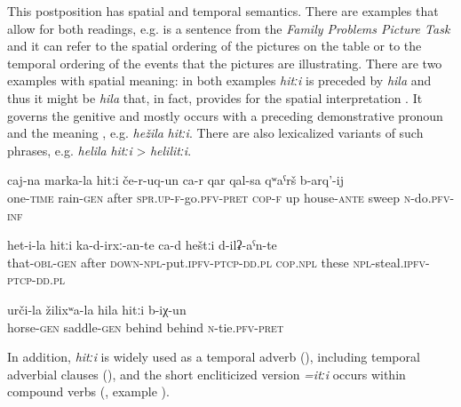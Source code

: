 This postposition has spatial and temporal semantics. There are examples that allow for both readings, e.g.  is a sentence from the \textit{Family Problems Picture Task} \citep{SanRoqueEtAl2012} and it can refer to the spatial ordering of the pictures on the table or to the temporal ordering of the events that the pictures are illustrating. There are two examples with spatial meaning: in both examples \textit{hitːi} is preceded by \textit{hila} and thus it might be \textit{hila} that, in fact, provides for the spatial interpretation . It governs the genitive and mostly occurs with a preceding demonstrative pronoun and the meaning , e.g. \textit{hežila} \textit{hitːi}. There are also lexicalized variants of such phrases, e.g. \textit{helila} \textit{hitːi} > \textit{helilitːi}.
%
\begin{exe}
	\ex
	\begin{xlist}
		\ex	\label{Once after the rain (she) went up to sweep in front of the house}
		\gll	caj-na	marka-la	hitːi	če-r-uq-un ca-r	qar	qal-sa	qʷaˁrš	b-arq'-ij  \\
			one-\textsc{time}	rain-\textsc{gen}	after	\textsc{spr.up}-\textsc{f}-go.\textsc{pfv}-\textsc{pret} \textsc{cop-f}	up	house-\textsc{ante}	sweep	\textsc{n}-do.\textsc{pfv}-\textsc{inf}\\
		\glt	{}

		\ex	\label{After this (one) must put these, these where they steal}
		\gll	het-i-la	hitːi	ka-d-irxː-an-te ca-d	heštːi	d-ilʡ-aˁn-te \\
			that-\textsc{obl}-\textsc{gen}	after	\textsc{down-npl}-put.\textsc{ipfv}-\textsc{ptcp}-\textsc{dd}.\textsc{pl} \textsc{cop.npl}	these	\textsc{npl}-steal.\textsc{ipfv}-\textsc{ptcp}-\textsc{dd}.\textsc{pl}\\
		\glt	{}

		\ex	\label{He tied it behind the saddle}
		\gll	urči-la	žilixʷa-la	hila	hitːi	b-iχ-un  \\
			horse-\textsc{gen}	saddle-\textsc{gen}	behind	behind	\textsc{n}-tie.\textsc{pfv}-\textsc{pret}\\
		\glt	{}
	\end{xlist}
\end{exe}

In addition, \textit{hitːi} is widely used as a temporal adverb (), including temporal adverbial clauses (), and the short encliticized version \textit{=itːi} occurs within compound verbs (, example ).


